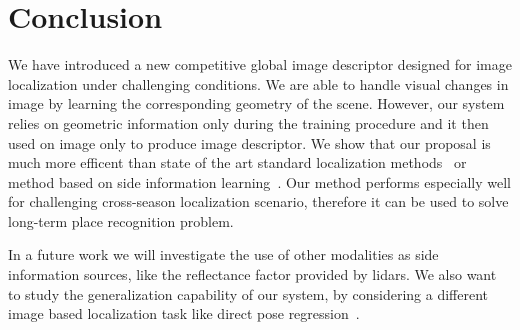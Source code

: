 \section{Conclusion}
\label{sec:conclusion}

We have introduced a new competitive global image descriptor designed for image localization under challenging conditions. We are able to handle visual changes in image by learning the corresponding geometry of the scene. However, our system relies on geometric information only during the training procedure and it then used on image only to produce image descriptor. We show that our proposal is much more efficent than state of the art standard localization methods~\cite{Arandjelovic2017, Radenovic2017} or method based on side information learning~\cite{Hoffman2016}. Our method performs especially well for challenging cross-season localization scenario, therefore it can be used to solve long-term place recognition problem.

In a future work we will investigate the use of other modalities as side information sources, like the reflectance factor provided by lidars. We also want to study the generalization capability of our system, by considering a different image based localization task like direct pose regression~\cite{Brachmann2018}.
